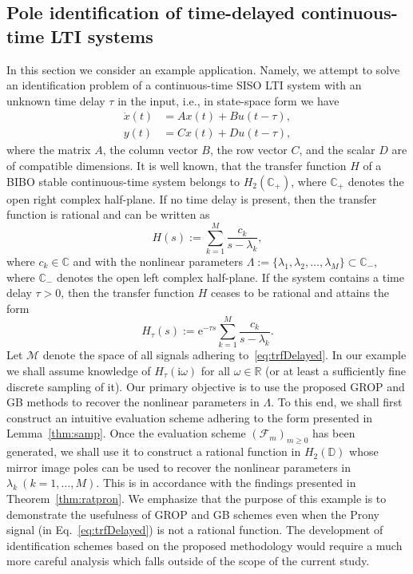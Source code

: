 \documentclass{arxiv}
\newcommand{\e}{\mathrm{e}}
\newcommand{\ri}{\mathrm{i}}
\newcommand{\cM}{\mathcal{M}}
\begin{document}
\subsection{Pole identification of time-delayed continuous-time LTI systems}

In this section we consider an example application. Namely, we attempt to solve an identification problem of a continuous-time SISO LTI system with an unknown time delay $\tau$ in the input, i.e., in state-space form we have
\begin{align*}
  \dot{x}(t) &= Ax(t) + Bu(t-\tau), \\
         y(t) &= Cx(t) + Du(t-\tau),
\end{align*}
where the matrix $A$, the column vector $B$, the row vector $C$, and the scalar $D$ are of compatible dimensions.
It is well known, that the transfer function $H$ of a BIBO stable continuous-time system belongs to $H_2(\mathbb{C}_{+})$, where $\mathbb{C}_{+}$ denotes the open right complex half-plane. If no time delay is present, then the transfer function is rational and can be written as
\begin{equation}
    \label{eq:trfcont}
    H(s) := \sum_{k=1}^{M} \frac{c_k}{s - \lambda_k}, 
\end{equation}
where $c_k \in \mathbb{C}$ and with the  nonlinear parameters $\Lambda := \{\lambda_1, \lambda_2, \ldots, \lambda_M \} \subset \mathbb{C}_{-}$, where $\mathbb{C}_{-}$ denotes the open left complex half-plane. If the system contains a time delay $\tau > 0$, then the transfer function $H$ ceases to be rational and attains the form
\begin{equation}
    \label{eq:trfDelayed}
    H_{\tau}(s) := \e^{-\tau s} \sum_{k=1}^{M} \frac{c_k}{s - \lambda_k}. 
\end{equation}
Let $\cM$ denote the space of all signals adhering to~\eqref{eq:trfDelayed}. In our example we shall assume knowledge of $H_{\tau}(\ri\omega)$ for all $ \omega \in \mathbb{R}$ (or at least a sufficiently fine discrete sampling of it). Our primary objective is to use the proposed GROP and GB methods to recover the nonlinear parameters in $\Lambda$. To this end, we shall first construct an intuitive evaluation scheme adhering to the form presented in Lemma~\ref{thm:samp}. Once the evaluation scheme ${(\mathcal{F}_m)}_{m \ge 0}$ has been generated, we shall use it to construct a rational function in $H_2(\mathbb{D})$ whose mirror image poles can be used to recover the nonlinear parameters in $\lambda_k \ (k=1,\ldots,M)$. This is in accordance with the findings presented in Theorem~\ref{thm:ratpron}. We emphasize that the purpose of this example is to demonstrate the usefulness of GROP and GB schemes even when the Prony signal (in Eq.~\eqref{eq:trfDelayed}) is not a rational function. The development of  identification schemes based on the proposed methodology would require a much more careful analysis which falls outside of the scope of the current study. 
\end{document}

